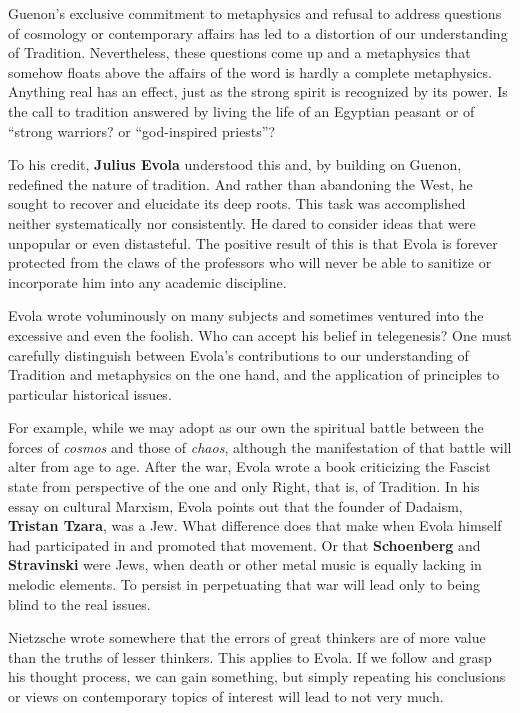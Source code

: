 Guenon's exclusive commitment to metaphysics and refusal to address questions of cosmology or contemporary affairs has led to a distortion of our understanding of Tradition. Nevertheless, these questions come up and a metaphysics that somehow floats above the affairs of the word is hardly a complete metaphysics. Anything real has an effect, just as the strong spirit is recognized by its power. Is the call to tradition answered by living the life of an Egyptian peasant or of ``strong warriors? or ``god-inspired priests''?

To his credit, \textbf{Julius Evola} understood this and, by building on Guenon, redefined the nature of tradition. And rather than abandoning the West, he sought to recover and elucidate its deep roots. This task was accomplished neither systematically nor consistently. He dared to consider ideas that were unpopular or even distasteful. The positive result of this is that Evola is forever protected from the claws of the professors who will never be able to sanitize or incorporate him into any academic discipline.

Evola wrote voluminously on many subjects and sometimes ventured into the excessive and even the foolish. Who can accept his belief in telegenesis? One must carefully distinguish between Evola's contributions to our understanding of Tradition and metaphysics on the one hand, and the application of principles to particular historical issues.

For example, while we may adopt as our own the spiritual battle between the forces of \emph{cosmos} and those of \emph{chaos}, although the manifestation of that battle will alter from age to age. After the war, Evola wrote a book criticizing the Fascist state from perspective of the one and only Right, that is, of Tradition. In his essay on cultural Marxism, Evola points out that the founder of Dadaism, \textbf{Tristan Tzara}, was a Jew. What difference does that make when Evola himself had participated in and promoted that movement. Or that \textbf{Schoenberg} and \textbf{Stravinski} were Jews, when death or other metal music is equally lacking in melodic elements. To persist in perpetuating that war will lead only to being blind to the real issues.

Nietzsche wrote somewhere that the errors of great thinkers are of more value than the truths of lesser thinkers. This applies to Evola. If we follow and grasp his thought process, we can gain something, but simply repeating his conclusions or views on contemporary topics of interest will lead to not very much.

